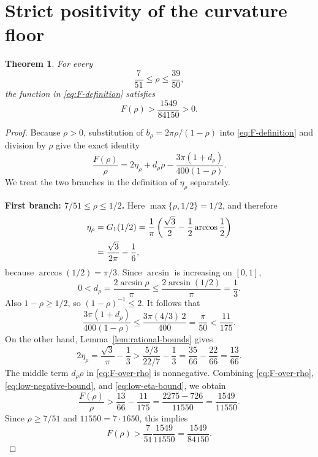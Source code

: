 \documentclass[11pt]{article}
\newtheorem{theorem}[lemma]{Theorem}
\begin{document}
\section{Strict positivity of the curvature floor}

\begin{theorem}
\label{thm:F-positive}
For every
\[
 \frac7{51}\leq\rho\leq\frac{39}{50},
\]
the function in \eqref{eq:F-definition} satisfies
\begin{equation}
 F(\rho)>\frac{1549}{84150}>0.
 \label{eq:uniform-F-lower}
\end{equation}
\end{theorem}

\begin{proof}
Because \(\rho>0\), substitution of
\(b_\rho=2\pi\rho/(1-\rho)\) into \eqref{eq:F-definition} and division
by \(\rho\) give the exact identity
\begin{equation}
 \frac{F(\rho)}{\rho}
 =2\eta_\rho+d_\rho\rho
 -\frac{3\pi(1+d_\rho)}{400(1-\rho)}.
 \label{eq:F-over-rho}
\end{equation}
We treat the two branches in the definition of \(\eta_\rho\) separately.

\medskip
\noindent
\textbf{First branch: \(7/51\leq\rho\leq1/2\).}
Here \(\max\{\rho,1/2\}=1/2\), and therefore
\begin{align}
 \eta_\rho
 &=G_1(1/2)
 =\frac1\pi\left(\frac{\sqrt3}{2}
 -\frac12\arccos\frac12\right)\notag\\
 &=\frac{\sqrt3}{2\pi}-\frac16,
 \label{eq:eta-low-branch}
\end{align}
because \(\arccos(1/2)=\pi/3\). Since \(\arcsin\) is increasing on
\([0,1]\),
\[
 0<d_\rho=\frac{2\arcsin\rho}{\pi}
 \leq\frac{2\arcsin(1/2)}{\pi}=\frac13.
\]
Also \(1-\rho\geq1/2\), so \((1-\rho)^{-1}\leq2\). It follows that
\begin{equation}
 \frac{3\pi(1+d_\rho)}{400(1-\rho)}
 \leq\frac{3\pi(4/3)\,2}{400}
 =\frac\pi{50}
 <\frac{11}{175}.
 \label{eq:low-negative-bound}
\end{equation}
On the other hand, Lemma~\ref{lem:rational-bounds} gives
\begin{equation}
 2\eta_\rho
 =\frac{\sqrt3}{\pi}-\frac13
 >\frac{5/3}{22/7}-\frac13
 =\frac{35}{66}-\frac{22}{66}
 =\frac{13}{66}.
 \label{eq:low-eta-bound}
\end{equation}
The middle term \(d_\rho\rho\) in \eqref{eq:F-over-rho} is nonnegative.
Combining \eqref{eq:F-over-rho}, \eqref{eq:low-negative-bound}, and
\eqref{eq:low-eta-bound}, we obtain
\begin{equation}
 \frac{F(\rho)}{\rho}
 >\frac{13}{66}-\frac{11}{175}
 =\frac{2275-726}{11550}
 =\frac{1549}{11550}.
 \label{eq:low-F-over-rho}
\end{equation}
Since \(\rho\geq7/51\) and \(11550=7\cdot1650\), this implies
\begin{equation}
 F(\rho)>\frac7{51}\frac{1549}{11550}
 =\frac{1549}{84150}.
 \label{eq:low-uniform-F}
\end{equation}


\end{proof}
\end{document}
